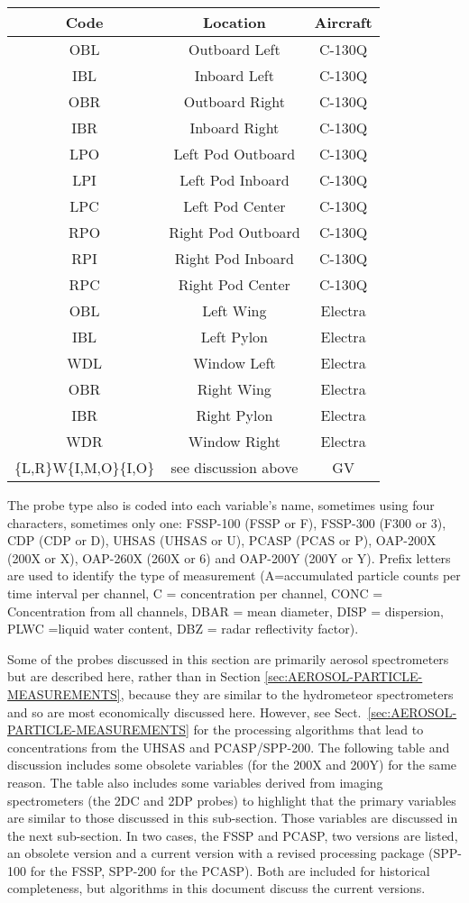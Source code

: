 \begin{center}
\begin{tabular}{|c|c|c|}
\hline 
\textbf{Code} & \textbf{Location} & \textbf{Aircraft}\tabularnewline
\hline 
\hline 
OBL  & Outboard Left  & C-130Q \tabularnewline
\hline 
IBL  & Inboard Left  & C-130Q \tabularnewline
\hline 
OBR  & Outboard Right  & C-130Q \tabularnewline
\hline 
IBR  & Inboard Right  & C-130Q \tabularnewline
\hline 
LPO  & Left Pod Outboard  & C-130Q \tabularnewline
\hline 
LPI  & Left Pod Inboard  & C-130Q \tabularnewline
\hline 
LPC  & Left Pod Center  & C-130Q \tabularnewline
\hline 
RPO  & Right Pod Outboard  & C-130Q \tabularnewline
\hline 
RPI  & Right Pod Inboard  & C-130Q \tabularnewline
\hline 
RPC  & Right Pod Center  & C-130Q \tabularnewline
\hline 
OBL  & Left Wing  & Electra \tabularnewline
\hline 
IBL  & Left Pylon  & Electra \tabularnewline
\hline 
WDL  & Window Left  & Electra \tabularnewline
\hline 
OBR  & Right Wing  & Electra \tabularnewline
\hline 
IBR  & Right Pylon  & Electra \tabularnewline
\hline 
WDR  & Window Right  & Electra \tabularnewline
\hline 
\{L,R\}W\{I,M,O\}\{I,O\} & see discussion above & GV\tabularnewline
\hline 
\end{tabular}
\par\end{center}

The probe type also is coded into each variable's name, sometimes
using four characters, sometimes only one: FSSP-100 (FSSP or F), FSSP-300
(F300 or 3), CDP (CDP or D), UHSAS (UHSAS or U), PCASP (PCAS or P),
OAP-200X (200X or X), OAP-260X (260X or 6) and OAP-200Y (200Y or Y).
Prefix letters are used to identify the type of measurement (A=accumulated
particle counts per time interval per channel, C = concentration per
channel, CONC = Concentration from all channels, DBAR = mean diameter,
DISP = dispersion, PLWC =liquid water content, DBZ = radar reflectivity
factor).

Some of the probes discussed in this section are primarily aerosol
spectrometers but are described here, rather than in Section \ref{sec:AEROSOL-PARTICLE-MEASUREMENTS},
because they are similar to the hydrometeor spectrometers and so are
most economically discussed here. However, see Sect.~\ref{sec:AEROSOL-PARTICLE-MEASUREMENTS}
for the processing algorithms that lead to concentrations from the
UHSAS and PCASP/SPP-200. The following table and discussion includes
some obsolete variables (for the 200X and 200Y) for the same reason.
The table also includes some variables derived from imaging spectrometers
(the 2DC and 2DP probes) to highlight that the primary variables are
similar to those discussed in this sub-section. Those variables are
discussed in the next sub-section. In two cases, the FSSP and PCASP,
two versions are listed, an obsolete version and a current version
with a revised processing package (SPP-100 for the FSSP, SPP-200 for
the PCASP). Both are included for historical completeness, but algorithms
in this document discuss the current versions.

